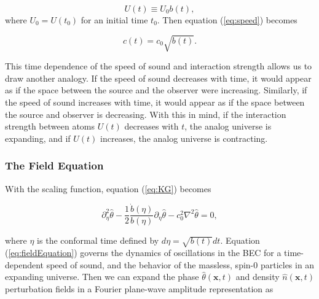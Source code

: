 \documentclass{article}
\begin{document}
                \begin{equation}
                    U(t) \equiv U_0 b(t),
                \end{equation}
\newpage
                where $U_0 = U(t_0)$ for an initial time $t_0$.  Then equation (\ref{eq:speed}) becomes 
    
                \begin{equation}
                    c(t) = c_0 \sqrt{b(t)}.
                \end{equation}
    
                This time dependence of the speed of sound and interaction strength allows us to draw another analogy.  If the speed of sound decreases with time, it would appear as if the space between the source and the observer were increasing.  Similarly, if the speed of sound increases with time, it would appear as if the space between the source and observer is decreasing. With this in mind, if the interaction strength between atoms $U(t)$ decreases with $t$, the analog universe is expanding, and if $U(t)$ increases, the analog universe is contracting.

            \subsubsection{The Field Equation}

                With the scaling function, equation (\ref{eq:KG}) becomes

                \begin{equation} \label{eq:fieldEquation}
                    \partial_\eta^2 \hat{\theta} - \frac{1}{2} \frac{\dot{b}(\eta)}{b(\eta)} \partial_\eta \hat{\theta} - c_0^2 \nabla^2 \hat{\theta} = 0,
                \end{equation}

                where $\eta$ is the conformal time defined by $d\eta = \sqrt{b(t)} dt$.  Equation (\ref{eq:fieldEquation}) governs the dynamics of oscillations in the BEC for a time-dependent speed of sound, and the behavior of the massless, spin-0 particles in an expanding universe.  Then we can expand the phase $\hat{\theta}(\mathbf{x}, t)$ and density $\hat{n}(\mathbf{x}, t)$ perturbation fields in a Fourier plane-wave amplitude representation as 
\end{document}
